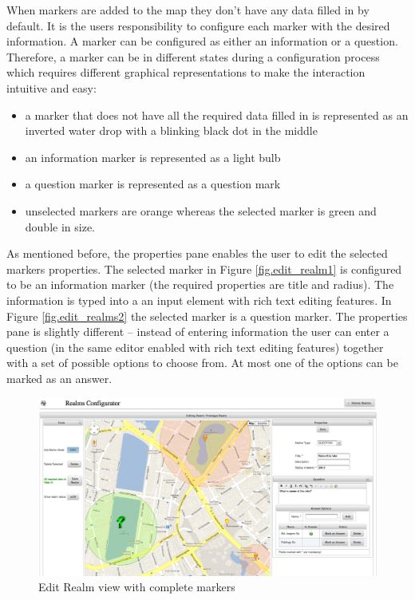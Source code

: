 \noindent When markers are added to the map they don't have any data filled in by default. It is the users responsibility to configure each marker with the desired information. A marker can be configured as either an information or a question. Therefore, a marker can be in different states during a configuration process which requires different graphical representations to make the interaction intuitive and easy:
\begin{itemize}
	\item a marker that does not have all the required data filled in is represented as an inverted water drop with a blinking black dot in the middle
	\item an information marker is represented as a light bulb
	\item a question marker is represented as a question mark
	\item unselected markers are orange whereas the selected marker is green and double in size.
\end{itemize}

\noindent As mentioned before, the properties pane enables the user to edit the selected markers properties. The selected marker in Figure \ref{fig.edit_realm1} is configured to be an information marker (the required properties are title and radius). The information is typed into a an input element with rich text editing features. In Figure \ref{fig.edit_realms2} the selected marker is a question marker. The properties pane is slightly different -- instead of entering information the user can enter a question (in the same editor enabled with rich text editing features) together with a set of possible options to choose from. At most one of the options can be marked as an answer.
\begin{figure}[H] 
	\centering
	\includegraphics[width=\linewidth]{fig/edit_realm2.png}
	\caption{Edit Realm view with complete markers}
	\label{fig.edit_realm2}
\end{figure}

